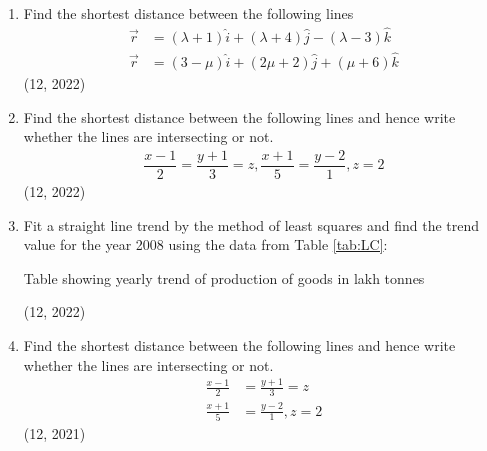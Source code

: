 \begin{enumerate}[label=\thesubsection.\arabic*,ref=\thesubsection.\theenumi]
\item Find the shortest distance between the following lines
	\begin{align}
		\vec{r}&=(\lambda+1)\hat{i}+(\lambda+4)\hat{j}-(\lambda-3)\hat{k}\\
		\vec{r}&=(3-\mu)\hat{i}+(2\mu+2)\hat{j}+(\mu+6)\hat{k}
	\end{align}
\hfill (12, 2022)

\item Find the shortest distance between the following lines and hence write whether the lines are intersecting or not.
	\begin{align}
		\dfrac{x-1}{2}=\dfrac{y+1}{3}=z, \dfrac{x+1}{5}=\dfrac{y-2}{1}, z=2
	\end{align}
\hfill (12, 2022)
\item Fit a straight line trend by the method of least squares and find the trend value for the year 2008 using the data from Table \ref{tab:LC}:
	\begin{table}[H]
		\caption{Table showing yearly trend of production of goods in lakh tonnes \label{tab:LC}}
		
	\end{table}
\hfill (12, 2022)
\item Find the shortest distance between the following lines and hence write
whether the lines are intersecting or not.
\begin{align}
  \frac{x-1}{2} &= \frac{y+1}{3} = z \\
  \frac{x+1}{5} &=\frac{y-2}{1},z=2
\end{align}
\hfill (12, 2021)

\end{enumerate}

